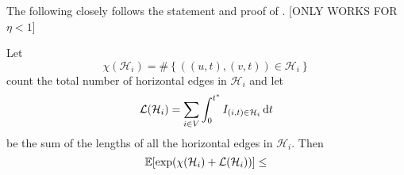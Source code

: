 The following closely follows the statement and proof of \cite[Lemma 3.1]{Lubetzky2014-po}. [ONLY WORKS FOR $\eta < 1$]
\begin{lemma}
	Let 
	\begin{equation}
		\chi(\mathcal{H}_i) = \#\left\{ \left( (u,t), (v,t) \right) \in \mathcal{H}_i \right\}
	\end{equation}
	count the total number of horizontal edges in $\mathcal{H}_i$ and let 
	\begin{equation}
		\mathcal{L}(\mathcal{H}_i) = \sum_{i \in V} \int_{0}^{t^*} I_{(i, t) \in \mathcal{H}_i} \, \mathrm{d} t
	\end{equation}
	be the sum of the lengths of all the horizontal edges in $\mathcal{H}_i$. Then
	\begin{equation}
		\mathbb{E}[\exp(\chi(\mathcal{H}_i) + \mathcal{L}(\mathcal{H}_i))] \leq 
	\end{equation}
\end{lemma}
